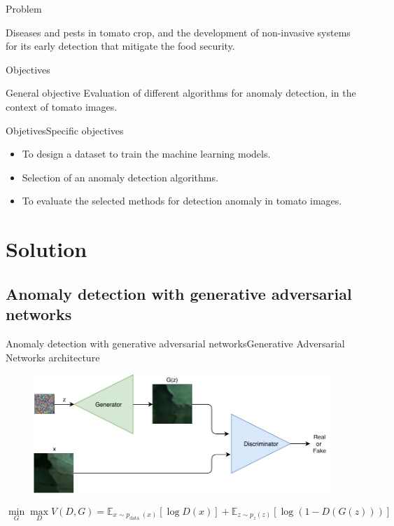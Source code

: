 \documentclass[15pt]{beamer} %
\begin{document}
\begin{frame}{Problem}
  
Diseases and pests in tomato crop, and the development of non-invasive systems for its early detection that mitigate the food security.
\end{frame}

\begin{frame}{Objectives}
 \begin{block}{General objective}
 Evaluation of different algorithms for anomaly
detection, in the context of tomato images.
 \end{block}
\end{frame}


\begin{frame}{Objetives}{\tiny{Specific objectives}}
  
  \begin{itemize}
  \item To design a dataset to train the machine learning models.
  \item Selection of an anomaly detection algorithms.
  \item To evaluate the selected methods for detection anomaly in tomato images.
  \end{itemize}
\end{frame}


\section{Solution}

\subsection{Anomaly detection with generative adversarial networks}


\begin{frame}{Anomaly detection with generative adversarial networks}{\tiny{Generative Adversarial Networks architecture}}
  \begin{figure}
   \centering
   \includegraphics[width=\textwidth]{gan}
  \end{figure}
  
  \begin{equation}
  \nonumber
 \min _{G} \max _{D} V(D, G)=\mathbb{E}_{x \sim p_{\text {data }}(x)}[\log D(x)]+\mathbb{E}_{z \sim p_{z}(z)}[\log (1-D(G(z)))]
\end{equation}
\end{frame}
\end{document}
